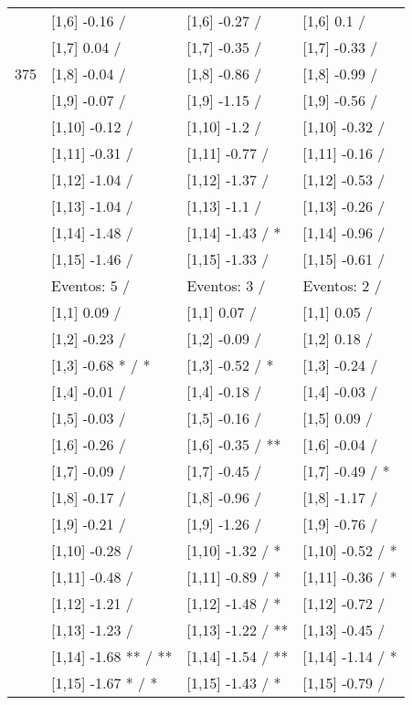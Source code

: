 \begin{table}
\begin{tabular}[t]{llll}
 & {}[1,6] -0.16  / & {}[1,6] -0.27  / & {}[1,6] 0.1  /\\
 & {}[1,7] 0.04  / & {}[1,7] -0.35  / & {}[1,7] -0.33  /\\
375 & {}[1,8] -0.04  / & {}[1,8] -0.86  / & {}[1,8] -0.99  /\\
\addlinespace
 & {}[1,9] -0.07  / & {}[1,9] -1.15  / & {}[1,9] -0.56  /\\
 & {}[1,10] -0.12  / & {}[1,10] -1.2  / & {}[1,10] -0.32  /\\
 & {}[1,11] -0.31  / & {}[1,11] -0.77  / & {}[1,11] -0.16  /\\
 & {}[1,12] -1.04  / & {}[1,12] -1.37  / & {}[1,12] -0.53  /\\
 & {}[1,13] -1.04  / & {}[1,13] -1.1  / & {}[1,13] -0.26  /\\
\addlinespace
 & {}[1,14] -1.48  / & {}[1,14] -1.43  / * & {}[1,14] -0.96  /\\
 & {}[1,15] -1.46  / & {}[1,15] -1.33  / & {}[1,15] -0.61  /\\
 & Eventos:  5 / & Eventos:  3 / & Eventos:  2 /\\
 & {}[1,1] 0.09  / & {}[1,1] 0.07  / & {}[1,1] 0.05  /\\
 & {}[1,2] -0.23  / & {}[1,2] -0.09  / & {}[1,2] 0.18  /\\
\addlinespace
 & {}[1,3] -0.68 * / * & {}[1,3] -0.52  / * & {}[1,3] -0.24  /\\
 & {}[1,4] -0.01  / & {}[1,4] -0.18  / & {}[1,4] -0.03  /\\
 & {}[1,5] -0.03  / & {}[1,5] -0.16  / & {}[1,5] 0.09  /\\
 & {}[1,6] -0.26  / & {}[1,6] -0.35  / ** & {}[1,6] -0.04  /\\
 & {}[1,7] -0.09  / & {}[1,7] -0.45  / & {}[1,7] -0.49  / *\\
\addlinespace
500 & {}[1,8] -0.17  / & {}[1,8] -0.96  / & {}[1,8] -1.17  /\\
 & {}[1,9] -0.21  / & {}[1,9] -1.26  / & {}[1,9] -0.76  /\\
 & {}[1,10] -0.28  / & {}[1,10] -1.32  / * & {}[1,10] -0.52  / *\\
 & {}[1,11] -0.48  / & {}[1,11] -0.89  / * & {}[1,11] -0.36  / *\\
 & {}[1,12] -1.21  / & {}[1,12] -1.48  / * & {}[1,12] -0.72  /\\
\addlinespace
 & {}[1,13] -1.23  / & {}[1,13] -1.22  / ** & {}[1,13] -0.45  /\\
 & {}[1,14] -1.68 ** / ** & {}[1,14] -1.54  / ** & {}[1,14] -1.14  / *\\
 & {}[1,15] -1.67 * / * & {}[1,15] -1.43  / * & {}[1,15] -0.79  /\\
\bottomrule
\end{tabular}
\end{table}
